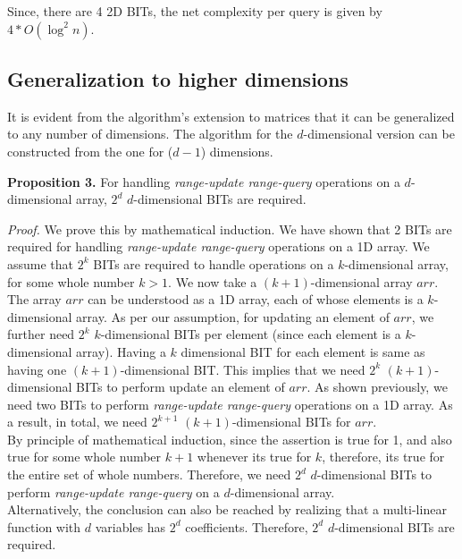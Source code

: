 \documentclass[a4paper]{article}
\begin{document}
\vspace{3 mm}
Since, there are 4 2D BITs, the net complexity per query is given by $4*O(\log^2 n)$.



\subsection{Generalization to higher dimensions}
It is evident from the algorithm's extension to matrices that it can be generalized to any number of dimensions. The algorithm for the $d$-dimensional version can be constructed from the one for ($d-1$) dimensions.

\vspace{2 mm}
\noindent
\textbf{Proposition 3.} For handling \textit{range-update range-query} operations on a $d$-dimensional array, $2^d$ $d$-dimen\-sional BITs are required.

\vspace{1 mm}
\noindent
\textit{Proof.} We prove this by mathematical induction. We have shown that 2 BITs are required for handling \textit{range-update range-query} operations on a 1D array. We assume that $2^k$ BITs are required to handle operations on a $k$-dimensional array, for some whole number $k > 1$.
We now take a $(k+1)$-dimensional array $arr$. The array $arr$ can be understood as a 1D array, each of whose elements is a $k$-dimensional array. As per our assumption, for updating an element of $arr$, we further need $2^k$ $k$-dimensional BITs per element (since each element is a $k$-dimensional array). Having a $k$ dimensional BIT for each element is same as having one $(k+1)$-dimensional BIT. This implies that we need $2^k$ $(k+1)$-dimensional BITs to perform update an element of $arr$. As shown previously, we need two BITs to perform \textit{range-update range-query} operations on a 1D array. As a result, in total, we need $2^{k+1}$ $(k+1)$-dimensional BITs for $arr$.\\
By principle of mathematical induction, since the assertion is true for 1, and also true for some whole number $k+1$ whenever its true for $k$, therefore, its true for the entire set of whole numbers. Therefore, we need $2^d$ $d$-dimensional BITs to perform \textit{range-update range-query} on a $d$-dimensional array.\\
Alternatively, the conclusion can also be reached by realizing that a multi-linear function with $d$ variables has $2^d$ coefficients. Therefore, $2^d$ $d$-dimensional BITs are required.
\end{document}
